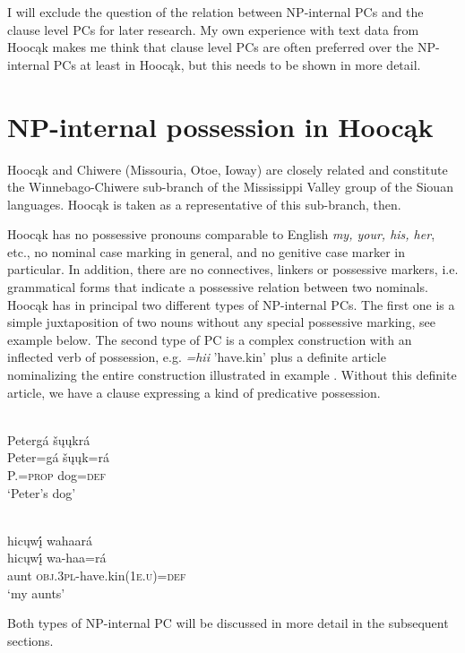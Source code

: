 \documentclass[output=paper]{LSP/langsci}
\begin{document}
I will exclude the question of the relation between NP-internal PCs and the clause level PCs for later research. My own experience with text data from Hoocąk makes me think that clause level PCs are often preferred over the NP-internal PCs at least in Hoocąk, but this needs to be shown in more detail. 

\section{NP-internal possession in Hoocąk}

Hoocąk and Chiwere (Missouria, Otoe, Ioway) are closely related and constitute the Winnebago-Chiwere sub-branch of the Mississippi Valley group of the Siouan languages. Hoocąk is taken as a representative of this sub-branch, then. 

Hoocąk has no possessive pronouns comparable to English \textit{my, your, his, her}, etc., no nominal case marking in general, and no genitive case marker in particular. In addition, there are no connectives, linkers or possessive markers, i.e. grammatical forms that indicate a possessive relation between two nominals. Hoocąk has in principal two different types of NP-internal PCs. The first one is a simple juxtaposition of two nouns without any special possessive marking, see example  below. The second type of PC is a complex construction with an inflected verb of possession, e.g. \textit{=hii} 'have.kin' plus a definite article nominalizing the entire construction illustrated in example . Without this definite article, we have a clause expressing a kind of predicative possession. 

\ea  \label{petersdog}
 {}{\citealt[16]{Helmbrecht2003}} \\
\ea
\glll Petergá šųųkrá\\
Peter=gá     šųųk=rá \\
P.=\textsc{prop}    dog=\textsc{def} \\
\glt `Peter's dog'

\ex	 \label{myaunts}
 {}{\citealt[19]{Helmbrecht2003}} \\
\glll hicųwį́ wahaará\\
hicųwį́  wa-haa=rá \\
aunt     \textsc{obj.3pl}-have.kin(\textsc{1e.u})=\textsc{def} \\
\glt `my aunts'
\z
\z

Both types of NP-internal PC will be discussed in more detail in the subsequent sections.
\end{document}
